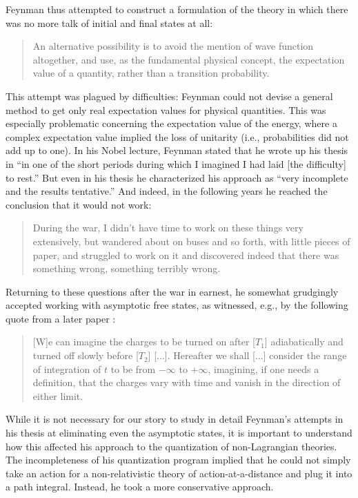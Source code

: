 \documentclass[12pt]{article}
\begin{document}
Feynman thus attempted to construct a formulation of the theory in which there was no more talk of initial and final states at all:

\begin{quote}
An alternative possibility is to avoid the mention of wave function altogether, and use, as the fundamental physical concept, the expectation value of a quantity, rather than a transition probability.
\end{quote}

This attempt was plagued by difficulties: Feynman could not devise a general method to get only real expectation values for physical quantities. This was especially problematic concerning the expectation value of the energy, where a complex expectation value implied the loss of unitarity (i.e., probabilities did not add up to one). In his Nobel lecture, Feynman stated that he wrote up his thesis in ``in one of the short periods during which I imagined I had laid [the difficulty] to rest.'' But even in his thesis he characterized his approach as ``very incomplete and the results tentative.'' And indeed, in the following years he reached the conclusion that it would not work:

\begin{quote}
During the war, I didn't have time to work on these things very extensively, but wandered about on buses and so forth, with little pieces of paper, and struggled to work on it and discovered indeed that there was something wrong, something terribly wrong.
\end{quote}

Returning to these questions after the war in earnest, he somewhat grudgingly accepted working with asymptotic free states, as witnessed, e.g., by the following quote from a later paper \citep{feynman_1950_mathematical}:

 \begin{quote}
 [W]e can imagine the charges to be turned on after [$T_1$] adiabatically and turned off slowly before [$T_2$] [...]. Hereafter we shall [...] consider the range of integration of $t$ to be from $- \infty$ to $+ \infty$, imagining, if one needs a definition, that the charges vary with time and vanish in the direction of either limit.
 \end{quote}
 
 While it is not necessary for our story to study in detail Feynman's attempts in his thesis at eliminating even the asymptotic states, it is important to understand how this affected his approach to the quantization of non-Lagrangian theories. The incompleteness of his quantization program implied that he could not simply take an action for a non-relativistic theory of action-at-a-distance and plug it into a path integral. Instead, he took a more conservative approach.
 
\end{document}
